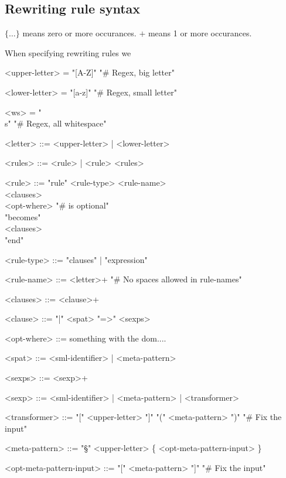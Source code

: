\subsection{Rewriting rule syntax}

$\{ \ldots \}$ means zero or more occurances.
$+$ means 1 or more occurances.

When specifying rewriting rules we 


\setlength{\grammarindent}{7.3em}
\begin{grammar} 
 
  <upper-letter> = "[A-Z]" \hfill "# Regex, big letter"

  <lower-letter> = "[a-z]" \hfill "# Regex, small letter"

  <ws> = "\\s" \hfill "\# Regex, all whitespace"

  <letter> ::= <upper-letter> | <lower-letter>

  <rules> ::= <rule> | <rule> <rules>

  <rule> ::= "rule" <rule-type> <rule-name> \\
             \hspace*{1em} <clauses> \\
             <opt-where> \hfill "\# is optional" \\
             "becomes" \\
             \hspace*{1em} <clauses> \\
             "end"

  <rule-type> ::= "clauses" | "expression" 

  <rule-name> ::= <letter>+ \hfill "\# No spaces allowed in rule-names"

  <clauses> ::= <clause>+

  <clause> ::= "|" <spat> "=>" <sexps>

  <opt-where> ::= something with the dom....

  <spat> ::= <sml-identifier> | <meta-pattern>

  <sexps>  ::= <sexp>+
  
  <sexp>   ::= <sml-identifier> | <meta-pattern> | <transformer>

  <transformer> ::= "[" <upper-letter> "]" "(" <meta-pattern> ")" \hfill "\# Fix the input"

  <meta-pattern> ::= "§" <upper-letter> \{ <opt-meta-pattern-input> \}

  <opt-meta-pattern-input> ::= "[" <meta-pattern> "]" \hfill "\# Fix the input"

\end{grammar}

